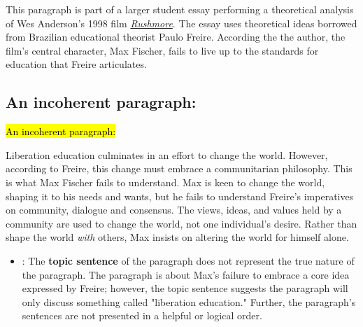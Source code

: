 This paragraph is part of a larger student essay performing a theoretical analysis of Wes Anderson's 1998 film \href{http://en.wikipedia.org/wiki/Rushmore_%28film%29}{\emph{Rushmore}}. The essay uses theoretical ideas borrowed from Brazilian educational theorist Paulo Freire. According the the author, the film's central character, Max Fischer, fails to live up to the standards for education that Freire articulates.

\subsection*{An incoherent paragraph:} 

\bigskip

\begin{tcolorbox}[enhanced,width=4.2in,left=.3in, right=.3in,
   drop fuzzy shadow southeast,
    boxrule=0.4pt,sharp corners,colframe=black!80!black,colback=white!10]

\medskip

{\small
\begin{doublespacing}

\hl{An incoherent paragraph:}\medskip

\hspace{.5cm}Liberation education culminates in an effort to change the world. However, according to Freire, this change must embrace a communitarian philosophy. This is what Max Fischer fails to understand. Max is keen to change the world, shaping it to his needs and wants, but he fails to understand Freire's imperatives on community, dialogue and consensus. The views, ideas, and values held by a community are used to change the world, not one individual's desire. Rather than shape the world \emph{with} others, Max insists on altering the world for himself alone.

\medskip

\end{doublespacing}}

\end{tcolorbox}

\begin{itemize}
\item {}: The \textbf{topic sentence} of the paragraph does not represent the true nature of the paragraph. The paragraph is about Max's failure to embrace a core idea expressed by Freire; however, the topic sentence suggests the paragraph will only discuss something called "liberation education." Further, the paragraph's sentences are not presented in a helpful or logical order.
\end{itemize}

